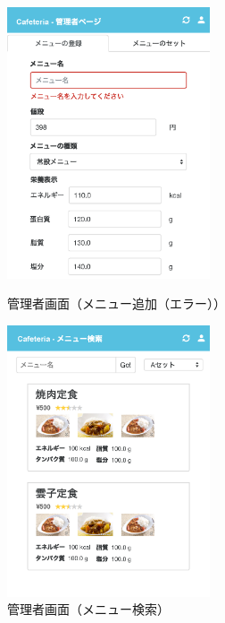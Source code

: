 \documentclass[a4paper]{ltjsarticle}
\begin{document}
        \begin{figure}[ht]
            \begin{minipage}[t]{.49\textwidth}
                \center
                \includegraphics[width=60mm]{ui/admin-home-new-menu-error.png}
                \caption{管理者画面（メニュー追加（エラー））}
                \label{img:admin-home-new-menu-error}
            \end{minipage}
            \begin{minipage}[t]{.49\textwidth}
                \center
                \includegraphics[width=60mm]{ui/admin-menu-search.png}
                \caption{管理者画面（メニュー検索）}
                \label{img:admin-menu-search}
            \end{minipage}
        \end{figure}
\end{document}
